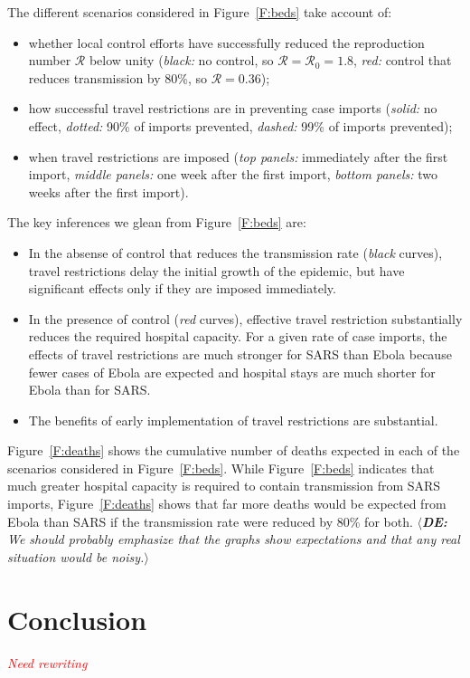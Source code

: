 \documentclass[12pt]{article}
\newcommand{\R}{{\mathcal R}}
\newcommand{\fref}[1]{Figure~\ref{F:#1}}
\newcommand{\de}[1]{$\langle${\footnotesize{\color{cyan}\slshape{\bfseries DE:} #1}$\rangle$}}
\begin{document}
The different scenarios considered in \fref{beds} take account of:
\begin{itemize}
\item  whether local control efforts have successfully reduced the reproduction number $\R$ below unity (\emph{black:} no control, so $\R=\R_0=1.8$, \emph{red:} control that reduces transmission by 80\%, so $\R=0.36$);
\item how successful travel restrictions are in preventing case imports (\emph{solid:} no effect, \emph{dotted:} 90\% of imports prevented, \emph{dashed:} 99\% of imports prevented);
\item when travel restrictions are imposed (\emph{top panels:} immediately after the first import, \emph{middle panels:} one week after the first import, \emph{bottom panels:} two weeks after the first import).
\end{itemize}
The key inferences we glean from \fref{beds} are:
\begin{itemize}
\item In the absense of control that reduces the transmission rate (\emph{black} curves), travel restrictions delay the initial growth of the epidemic, but have significant effects only if they are imposed immediately.
\item In the presence of control (\emph{red} curves), effective travel restriction substantially reduces the required hospital capacity.  For a given rate of case imports, the effects of travel restrictions are much stronger for SARS than Ebola because fewer cases of Ebola are expected and hospital stays are much shorter for Ebola than for SARS.
\item The benefits of early implementation of travel restrictions are substantial.
\end{itemize}

\fref{deaths} shows the cumulative number of deaths expected in each of the scenarios considered in \fref{beds}.  While \fref{beds} indicates that much greater hospital capacity is required to contain transmission from SARS imports, \fref{deaths} shows that far more deaths would be expected from Ebola than SARS if the transmission rate were reduced by 80\% for both.
\de{We should probably emphasize that the graphs show \emph{expectations} and that any real situation would be noisy.}

\section{Conclusion}
\emph{\textcolor{red}{Need rewriting}}
\end{document}
